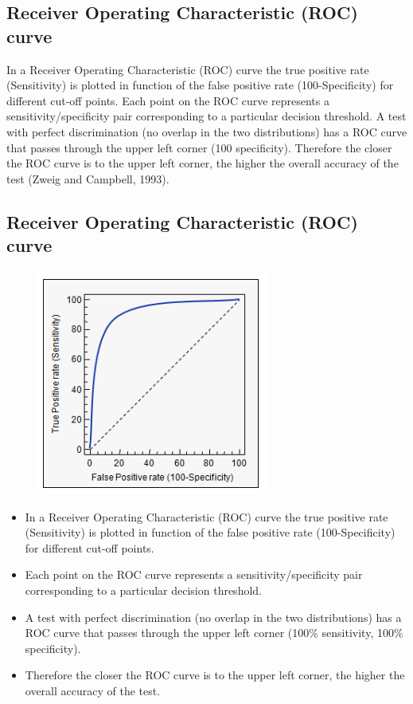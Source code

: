 \documentclass[a4paper,12pt]{article}
\begin{document}
\subsection*{Receiver Operating Characteristic (ROC) curve}
In a Receiver Operating Characteristic (ROC) curve the true positive rate
(Sensitivity) is plotted in function of the false positive rate (100-Specificity)
for different cut-off points. Each point on the ROC curve represents a sensitivity/specificity
pair corresponding to a particular decision threshold. A
test with perfect discrimination (no overlap in the two distributions) has a
ROC curve that passes through the upper left corner (100%
specificity). Therefore the closer the ROC curve is to the upper left corner,
the higher the overall accuracy of the test (Zweig and Campbell, 1993).

\subsection*{Receiver Operating Characteristic (ROC) curve}
\begin{figure}
	\centering
	\includegraphics[width=0.55\linewidth]{ROCcurve}
	\caption{}
	\label{fig:roccurve}
\end{figure}
\begin{itemize}
	\item In a Receiver Operating Characteristic (ROC) curve the true positive rate
	(Sensitivity) is plotted in function of the false positive rate (100-Specificity)
	for different cut-off points. 
	\item Each point on the ROC curve represents a sensitivity/specificity
	pair corresponding to a particular decision threshold. 
	\item A
	test with perfect discrimination (no overlap in the two distributions) has a
	ROC curve that passes through the upper left corner (100\% sensitivity, 100\%
	specificity). 
	\item Therefore the closer the ROC curve is to the upper left corner,
	the higher the overall accuracy of the test. %
\end{itemize}
\end{document}
